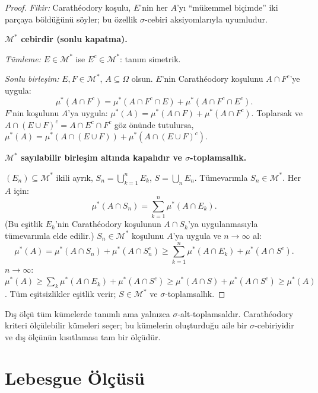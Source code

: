 \begin{proof}
\textit{Fikir:} Carathéodory koşulu, $E$'nin her $A$'yı ``mükemmel biçimde''
iki parçaya böldüğünü söyler; bu özellik $\sigma$-cebiri aksiyomlarıyla uyumludur.

\medskip

\textbf{$\mathcal{M}^*$ cebirdir (sonlu kapatma).}

\textit{Tümleme:} $E \in \mathcal{M}^*$ ise $E^c \in \mathcal{M}^*$: tanım simetrik.

\textit{Sonlu birleşim:} $E, F \in \mathcal{M}^*$, $A \subseteq \Omega$ olsun.
$E$'nin Carathéodory koşulunu $A \cap F^c$'ye uygula:
\[
  \mu^*(A \cap F^c) = \mu^*(A \cap F^c \cap E) + \mu^*(A \cap F^c \cap E^c).
\]
$F$'nin koşulunu $A$'ya uygula: $\mu^*(A) = \mu^*(A \cap F) + \mu^*(A \cap F^c)$.
Toplarsak ve $A \cap (E \cup F)^c = A \cap E^c \cap F^c$ göz önünde tutulursa,
$\mu^*(A) = \mu^*(A \cap (E \cup F)) + \mu^*(A \cap (E \cup F)^c)$.

\medskip

\textbf{$\mathcal{M}^*$ sayılabilir birleşim altında kapalıdır ve $\sigma$-toplamsallık.}

$(E_n) \subseteq \mathcal{M}^*$ ikili ayrık, $S_n = \bigcup_{k=1}^n E_k$, $S = \bigcup_n E_n$.
Tümevarımla $S_n \in \mathcal{M}^*$. Her $A$ için:
\[
  \mu^*(A \cap S_n) = \sum_{k=1}^n \mu^*(A \cap E_k).
\]
(Bu eşitlik $E_k$'nin Carathéodory koşulunun $A \cap S_k$'ya uygulanmasıyla tümevarımla elde edilir.)
$S_n \in \mathcal{M}^*$ koşulunu $A$'ya uygula ve $n \to \infty$ al:
\[
  \mu^*(A) = \mu^*(A \cap S_n) + \mu^*(A \cap S_n^c)
  \geq \sum_{k=1}^n \mu^*(A \cap E_k) + \mu^*(A \cap S^c).
\]
$n \to \infty$: $\mu^*(A) \geq \sum_k \mu^*(A \cap E_k) + \mu^*(A \cap S^c)
\geq \mu^*(A \cap S) + \mu^*(A \cap S^c) \geq \mu^*(A)$.
Tüm eşitsizlikler eşitlik verir; $S \in \mathcal{M}^*$ ve $\sigma$-toplamsallık.
\end{proof}

\begin{mikroozet}[§1.3 özeti]
Dış ölçü tüm kümelerde tanımlı ama yalnızca $\sigma$-alt-toplamsaldır.
Carathéodory kriteri ölçülebilir kümeleri seçer; bu kümelerin oluşturduğu
aile bir $\sigma$-cebiriyidir ve dış ölçünün kısıtlaması tam bir ölçüdür.
\end{mikroozet}


\section{Lebesgue Ölçüsü}

